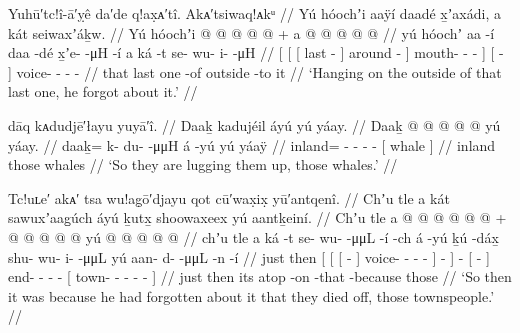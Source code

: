 \ex\label{ex:90-101-last-one-hanging-there-forgot}%
%
\begingl
	\glpreamble	Yuhū′tc!î-ā′ỵê da′de q!ax̣ᴀ′tî.
Akᴀ′tsiwaq!ᴀkᵘ //
	\glpreamble	Yú hóochʼi aaÿí daadé x̱ʼaxádi, a kát seiwaxʼáḵw. //
	\gla	{} {} {} Yú hóochʼi  @ {} {}  @ {} {}
			 @ {} @ {} @ {} {} +
		{} a  @ {} {}
		 @ {} @ {} @ {} @ {} //
	\glb	{} {} {} yú hóochʼ aa -í {} daa -dé {}
			x̱ʼe-  -μH -í {}
		{} a ká -t {}
		se- wu- i-  -μH //
	\glc	{}[ {}[ {}[  last  - {}] around - {}]
			mouth-  - - {}]
		{}[   - {}]
		voice- - -  - //
	\gld	{} {} {} that last one -of {} outside -to {}
			 {} {} {} {}
		{} it  {} {}
		 {} {} {} {} //
	\glft	‘Hanging on the outside of that last one, he forgot about it.’
		//
\endgl
\xe

\ex\label{ex:90-102-theyre-taking-it-up-that-whale}%
%
\begingl
	\glpreamble	dāq kᴀdudjē′łayu yuyā′î. // 
	\glpreamble	Daaḵ kadujéil áyú yú yáay. //
	\gla	Daaḵ @  @ {} @ {} @ {}
		 @ {}
		{} yú yáay. {} //
	\glb	daaḵ= k- du-  -μμH
		á -yú
		{} yú yáaÿ {} //
	\glc	inland= - -  -
		 -
		{}[  whale {}] //
	\gld	inland  {} {} {}
		 {}
		{} those whales {} //
	\glft	‘So they are lugging them up, those whales.’
		//
\endgl
\xe

\ex\label{ex:90-103-because-forgot-died-out}%
%
\begingl
	\glpreamble	Tc!uʟe′ akᴀ′ tsa wu!ag̣ō′djayu qot cū′wax̣ix̣ yū′antqenî. //
	\glpreamble	Chʼu tle a kát sawuxʼaag̱úch áyú ḵutx̱ shoowaxeex yú aantḵeiní. //
	\gla	Chʼu tle {} {} {} a  @ {} {}
			 @ {} @ {} @ {} @ {} {} {} {}
		 @ {} +
		{}  @ {} {}  @ {} @ {} @ {} @ {}
		{} yú  @ {} @ {} @ {} @ {} @ {} {} //
	\glb	chʼu tle {} {} {} a ká -t {}
			se- wu-  -μμL -í {} -ch {}
		á -yú
		{} ḵú -dáx̱ {} shu- wu- i-  -μμL
		{} yú aan- d-  -μμL -n -í {} //
	\glc	just then {}[ {}[ {}[   - {}]
			voice- -  - - {}] - {}]
		 -
		{}[  - {}] end- - -  -
		{}[  town- -  - - - {}] //
	\gld	just then {} {} {} its atop -on {}
			 {} {} {} -that {} -because {}
		 {}
		{}  {} {}  {} {} {} {}
		{} those  {} {} {} {} {} {} //
	\glft	‘So then it was because he had forgotten about it that they died off, those townspeople.’
		//
\endgl
\xe

